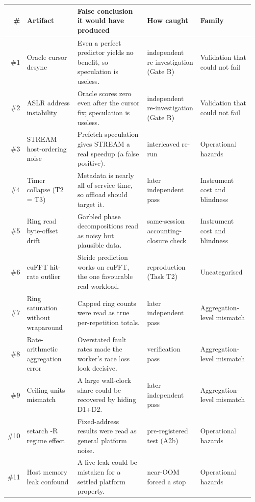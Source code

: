 \begin{tabular}{@{}rp{2.3cm}p{4.2cm}p{2.2cm}p{2.2cm}@{}}
\toprule
\# & Artifact & False conclusion it would have produced & How caught & Family \\
\midrule
\#1 & Oracle cursor desync & Even a perfect predictor yields no benefit, so speculation is useless. & independent re-investigation (Gate B) & Validation that could not fail \\ %
\#2 & ASLR address instability & Oracle scores zero even after the cursor fix; speculation is useless. & independent re-investigation (Gate B) & Validation that could not fail \\ %
\#3 & STREAM host-ordering noise & Prefetch speculation gives STREAM a real speedup (a false positive). & interleaved re-run & Operational hazards \\ %
\#4 & Timer collapse (T2 = T3) & Metadata is nearly all of service time, so offload should target it. & later independent pass & Instrument cost and blindness \\ %
\#5 & Ring read byte-offset drift & Garbled phase decompositions read as noisy but plausible data. & same-session accounting-closure check & Instrument cost and blindness \\ %
\#6 & cuFFT hit-rate outlier & Stride prediction works on cuFFT, the one favourable real workload. & reproduction (Task T2) & Uncategorised \\ %
\#7 & Ring saturation without wraparound & Capped ring counts were read as true per-repetition totals. & later independent pass & Aggregation-level mismatch \\ %
\#8 & Rate-arithmetic aggregation error & Overstated fault rates made the worker's race loss look decisive. & verification pass & Aggregation-level mismatch \\ %
\#9 & Ceiling units mismatch & A large wall-clock share could be recovered by hiding D1+D2. & later independent pass & Aggregation-level mismatch \\ %
\#10 & setarch -R regime effect & Fixed-address results were read as general platform noise. & pre-registered test (A2b) & Operational hazards \\ %
\#11 & Host memory leak confound & A live leak could be mistaken for a settled platform property. & near-OOM forced a stop & Operational hazards \\ %

\end{tabular}
